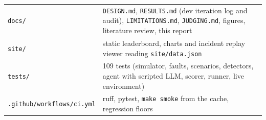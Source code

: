 \documentclass[11pt,a4paper]{article}
\newcommand{\code}[1]{\texttt{#1}}
\begin{document}
\begin{table}[H]
\begin{tabularx}{\textwidth}{l X}
\code{docs/} & \code{DESIGN.md}, \code{RESULTS.md} (dev iteration log and audit), \code{LIMITATIONS.md}, \code{JUDGING.md}, figures, literature review, this report \\
\code{site/} & static leaderboard, charts and incident replay viewer reading \code{site/data.json} \\
\code{tests/} & 109 tests (simulator, faults, scenarios, detectors, agent with scripted LLM, scorer, runner, live environment) \\
\code{.github/workflows/ci.yml} & ruff, pytest, \code{make smoke} from the cache, regression floors \\
\bottomrule
\end{tabularx}
\end{table}
\end{document}
